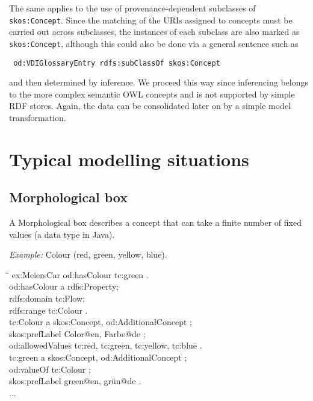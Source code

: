 \documentclass[11pt,a4paper]{article}
\newenvironment{code}{\tt \begin{tabbing}
\hskip12pt\=\hskip12pt\=\hskip12pt\=\hskip12pt\=\hskip5cm\=\hskip5cm\=\kill}
{\end{tabbing}}
\def\dq{{\char34}}
\begin{document}
The same applies to the use of provenance-dependent subclasses of
\texttt{skos:Concept}.  Since the matching of the URIs assigned to concepts
must be carried out across subclasses, the instances of each subclass are also
marked as \texttt{skos:Concept}, although this could also be done via a
general sentence such as
\begin{center}\tt
  od:VDIGlossaryEntry rdfs:subClassOf skos:Concept
\end{center}
and then determined by inference. We proceed this way since inferencing
belongs to the more complex semantic OWL concepts and is not supported by
simple RDF stores. Again, the data can be consolidated later on by a simple
model transformation.  

\section{Typical modelling situations}

\subsection{Morphological box}

A Morphological box describes a concept that can take a finite number of fixed
values (a  data type in Java).

\emph{Example:}  Colour (red, green, yellow, blue).

\begin{code}
  ex:MeiersCar od:hasColour tc:green . \\[4pt]
    
  od:hasColour a rdfs:Property;\\
    \>rdfs:domain tc:Flow;\\
    \>rdfs:range tc:Colour .\\[4pt]

  tc:Colour a skos:Concept, od:AdditionalConcept ;\\
  \>skos:prefLabel {\dq}Color{\dq}@en, {\dq}Farbe{\dq}@de ;\\
  \>od:allowedValues tc:red, tc:green, tc:yellow, tc:blue .\\[4pt]

  tc:green a skos:Concept, od:AdditionalConcept ;\\
  \>od:valueOf tc:Colour ; \\
  \>skos:prefLabel {\dq}green{\dq}@en, {\dq}grün{\dq}@de .\\[4pt]
  ...  
\end{code}
\end{document}
